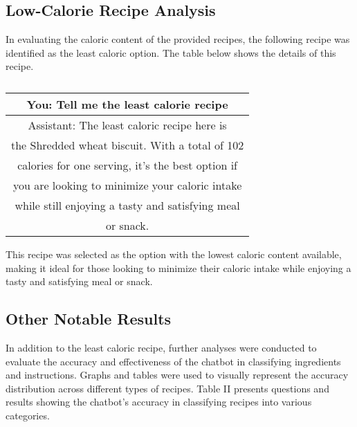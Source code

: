 \documentclass[conference]{IEEEtran}
\begin{document}
\subsection{Low-Calorie Recipe Analysis}

In evaluating the caloric content of the provided recipes, the following recipe was identified as the least caloric option. The table below shows the details of this recipe.

\begin{table}[ht]
    \centering
    \caption{}
    \label{tab:low_calorie_recipe}
    \begin{tabular}{|c|}
        \hline
        \rowcolor{lightgray} 
        You: Tell me the least calorie recipe \\
        \hline
        Assistant:  The least caloric recipe here is \\
        the Shredded wheat biscuit. With a total of 102 \\
        calories for one serving, it's the best option if\\
        you are looking to minimize your caloric intake\\
        while still enjoying a tasty and satisfying meal\\
        or snack. \\
        \hline
    \end{tabular}
\end{table}

This recipe was selected as the option with the lowest caloric content available, making it ideal for those looking to minimize their caloric intake while enjoying a tasty and satisfying meal or snack.

\subsection{Other Notable Results}

In addition to the least caloric recipe, further analyses were conducted to evaluate the accuracy and effectiveness of the chatbot in classifying ingredients and instructions. Graphs and tables were used to visually represent the accuracy distribution across different types of recipes. Table II presents questions and results showing the chatbot's accuracy in classifying recipes into various categories.
\end{document}
